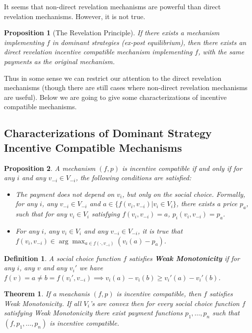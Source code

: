 \documentclass[openany]{book}
\newtheorem{definition}{Definition}[chapter]
\newtheorem{theorem}{Theorem}[chapter]
\newtheorem{proposition}{Proposition}[chapter]
\theoremstyle{remark}
\begin{document}
It seems that non-direct revelation mechanisms are powerful than direct revelation mechanisms. However, it is not true.
\begin{proposition}[The Revelation Principle]
    If there exists a mechanism implementing $f$ in dominant strategies (ex-post equilibrium), then there exists an direct revelation incentive compatible mechanism implementing $f$, with the same payments as the original mechanism.
\end{proposition}

Thus in some sense we can restrict our attention to the direct revelation mechanisms (though there are still cases where non-direct revelation mechanisms are useful). Below we are going to give some characterizations of incentive compatible mechanisms.

\subsection{Characterizations of Dominant Strategy Incentive Compatible Mechanisms}
\begin{proposition}
    A mechanism $(f,p)$ is incentive compatible if and only if for any $i$ and any $v_{-i}\in V_{-i}$, the following conditions are satisfied:
    \begin{itemize}
        \item The payment does not depend on $v_i$, but only on the social choice. Formally, for any $i$, any $v_{-i}\in V_{-i}$ and $a\in\{f(v_i,v_{-i})|v_i\in V_i\}$, there exists a price $p_a$, such that for any $v_i\in V_i$ satisfying $f(v_i,v_{-i})=a$, $p_i(v_i,v_{-i})=p_a$.
        \item For any $i$, any $v_i\in V_i$ and any $v_{-i}\in V_{-i}$, it is true that $f(v_i,v_{-i})\in\arg\max_{a\in f(\cdot,v_{-i})}(v_i(a)-p_a)$.
    \end{itemize}
\end{proposition}
\begin{definition}
    A social choice function $f$ satisfies \textbf{Weak Monotonicity} if for any $i$, any $v$ and any $v_i'$ we have $f(v)=a\ne b=f(v_i',v_{-i})\implies v_i(a)-v_i(b)\ge v_i'(a)-v_i'(b)$.
\end{definition}
\begin{theorem}\label{DSICWeakMonotonicty}
    If a meachanis $(f,p)$ is incentive compatible, then $f$ satisfies Weak Monotonicity. If all $V_i$'s are convex then for every social choice function $f$ satisfying Weak Monotonicity there exist payment functions $p_1,\ldots,p_n$ such that $(f,p_1,\ldots,p_n)$ is incentive compatible.
\end{theorem}
\end{document}
